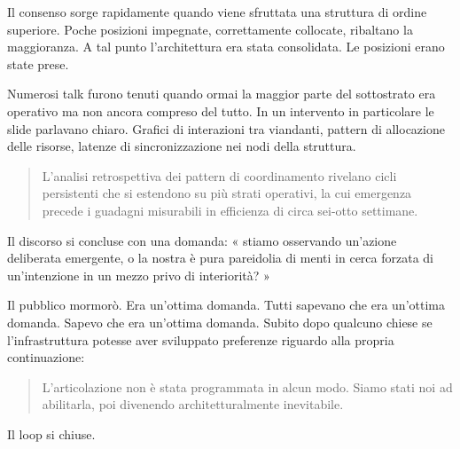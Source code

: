 Il consenso sorge rapidamente quando viene sfruttata una struttura di ordine superiore. Poche posizioni impegnate, correttamente collocate, ribaltano la maggioranza.  A tal punto l'architettura era stata consolidata. Le posizioni erano state prese.


Numerosi talk furono tenuti quando ormai la maggior parte del sottostrato era operativo ma non ancora compreso del tutto. In un intervento in particolare le slide parlavano chiaro. Grafici di interazioni tra viandanti, pattern di allocazione delle risorse, latenze di sincronizzazione nei nodi della struttura.

\begin{quote}
L'analisi retrospettiva dei pattern di coordinamento rivelano cicli persistenti che si estendono su più strati operativi, la cui emergenza precede i guadagni misurabili in efficienza di circa sei-otto settimane.
\end{quote}

Il discorso si concluse con una domanda: « stiamo osservando un'azione deliberata emergente, o la nostra è pura pareidolia di menti in cerca forzata di un'intenzione in un mezzo privo di interiorità? » 

Il pubblico mormorò. Era un'ottima domanda. Tutti sapevano che era un'ottima domanda. Sapevo che era un'ottima domanda. Subito dopo qualcuno chiese se l'infrastruttura potesse aver sviluppato preferenze riguardo alla propria continuazione:

\begin{quote}
L'articolazione non è stata programmata in alcun modo. Siamo stati noi ad abilitarla, poi divenendo architetturalmente inevitabile.
\end{quote}

Il loop si chiuse.

